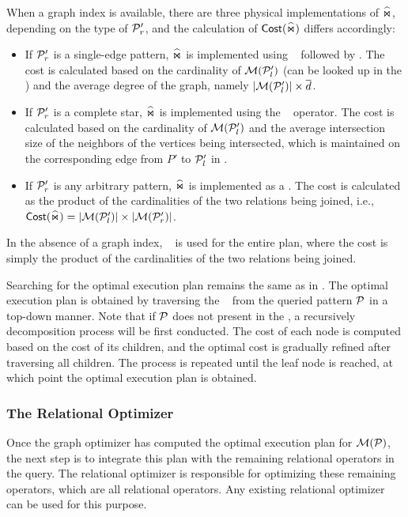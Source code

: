 When a graph index is available, there are three physical implementations of $\widehat{\Join}$, depending on the type of $\mathcal{P}'_r$, and the calculation of ${\mathsf{Cost}}(\widehat{\Join})$ differs accordingly:
\begin{itemize}
\item If $\mathcal{P}'_r$ is a single-edge pattern, $\widehat{\Join}$ is implemented using \expandedge~ followed by \getvertex. The cost is calculated based on the cardinality of $\mathcal{M}(\mathcal{P}'_l)$ (can be looked up in the \glogue) and the average degree of the graph, namely $|\mathcal{M}(\mathcal{P}'_l)| \times \overline{d}$.
\item If $\mathcal{P}'_r$ is a complete star, $\widehat{\Join}$ is implemented using the \expandintersect~ operator. The cost is calculated based on the cardinality of $\mathcal{M}(\mathcal{P}'_l)$ and the average intersection size of the neighbors of the vertices being intersected, which is maintained on the corresponding edge from $P'$ to $\mathcal{P}'_l$ in \glogue.
\item  If $\mathcal{P}'_r$ is any arbitrary pattern, $\widehat{\Join}$ is implemented as a \hashjoin. The cost is calculated as the product of the cardinalities of the two relations being joined, i.e., ${\mathsf{Cost}}(\widehat{\Join}) = |\mathcal{M}(\mathcal{P}'_l)| \times |\mathcal{M}(\mathcal{P}'_r)|$.
\end{itemize}

In the absence of a graph index, \hashjoin~ is used for the entire plan, where the cost is simply the product of the cardinalities of the two relations being joined.


 Searching for the optimal execution plan remains the same as in \glogs. The optimal execution plan is obtained by traversing the \glogue~ from the queried pattern $\mathcal{P}$ in a top-down manner.
Note that if $\mathcal{P}$ does not present in the \glogue, a recursively decomposition process will be first conducted. The cost of each node is computed based on the cost of its children, and the optimal cost is gradually refined after traversing all children. The process is repeated until the leaf node is reached, at which point the optimal execution plan is obtained.

\subsubsection{The Relational Optimizer}
Once the graph optimizer has computed the optimal execution plan for $\mathcal{M}(\mathcal{P})$, the next step is to integrate this plan with the remaining relational operators in the \spjm query. The relational optimizer is responsible for optimizing these remaining operators, which are all relational operators. Any existing relational optimizer can be used for this purpose.

